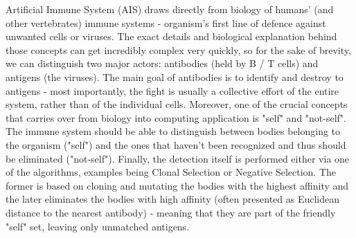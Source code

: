 \documentclass[letterpaper, 10 pt, conference]{ieeeconf}  %
\begin{document}
Artificial Immune System (AIS) draws directly from biology of humans' (and other vertebrates) immune systems - organism's first line of defence against unwanted cells or viruses. The exact details and biological explanation behind those concepts can get incredibly complex very quickly, so for the sake of brevity, we can distinguish two major actors: antibodies (held by B / T cells) and antigens (the viruses). The main goal of antibodies is to identify and destroy to antigens - most importantly, the fight is usually a collective effort of the entire system, rather than of the individual cells. Moreover, one of the crucial concepts that carries over from biology into computing application is "self" and "not-self". The immune system should be able to distinguish between bodies belonging to the organism ("self") and the ones that haven't been recognized and thus should be eliminated ("not-self"). Finally, the detection itself is performed either via one of the algorithms, examples being Clonal Selection or Negative Selection. The former is based on cloning and mutating the bodies with the highest affinity and the later eliminates the bodies with high affinity (often presented as Euclidean distance to the nearest antibody) - meaning that they are part of the friendly "self" set, leaving only unmatched antigens.
\end{document}
